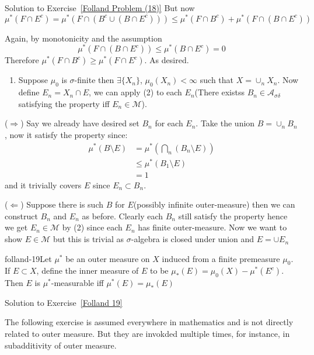 \begin{mystsolution}{Solution to Exercise~\ref{Folland Problem (18)}}
But now
\begin{equation}
\mu^*(F\cap E^c) = \mu^*(F\cap (B^c \cup (B\cap E^c))) \leq \mu^*(F\cap B^c)  + \mu^*(F\cap (B\cap E^c))
\end{equation}

Again, by monotonicity and the assumption
\begin{equation}
\mu^*(F\cap (B\cap E^c))\leq \mu^*(B\cap E^c) = 0
\end{equation}
Therefore
$\mu^*(F \cap B^c) \geq  \mu^*(F\cap E^c)$. As desired.

\begin{enumerate}[resume]
\item Suppose $\mu_0$ is $\sigma$-finite then $\exists \{X_n\}$, $\mu_0(X_n)<\infty$ such that $X = \cup_n X_n$. Now define $E_n= X_n\cap E$, we can apply (2) to each $E_n$(There existss $B_n\in \mathcal A_{\sigma\delta}$ satisfying the property iff $E_n\in \mathcal M$).
\end{enumerate}

($\Longrightarrow$)  Say we already have desired set $B_n$ for each $E_n$. Take the union $B=\cup_n B_n$, now it satisfy the property since:
\begin{equation}
\begin{aligned}
\mu^*(B\setminus E) &=\mu^*(\bigcap_n (B_n \setminus E))  \\
&\leq \mu^*(B_1\setminus E) \\
&=1
\end{aligned}
\end{equation}
and it trivially covers $E$ since $E_n \subset B_n$.

($\Longleftarrow$) Suppose there is such $B$ for $E$(possibly infinite outer-measure) then we can construct $B_n$ and $E_n$ as before. Clearly each $B_n$ still satisfy the property hence we get $E_n \in \mathcal M$ by (2) since each $E_n$ has finite outer-measure. Now we want to show $E \in \mathcal M$ but this is trivial as $\sigma$-algebra is closed under union and $E= \cup E_n$

\end{mystsolution}
\begin{mystexercise}{}{folland-19}\label{Folland 19}\label{folland 19}Let $\mu^*$ be an outer measure on $X$ induced from a finite premeasure $\mu_0$. If $E \subset X$, define the inner measure of $E$ to be $\mu_*(E) = \mu_0(X) - \mu^*(E^c)$. Then $E$ is $\mu^*$-measurable iff $\mu^*(E) = \mu_*(E)$

\end{mystexercise}
\begin{mystsolution}{Solution to Exercise~\ref{Folland 19}}\end{mystsolution}
The following exercise is assumed everywhere in mathematics and is not directly related to outer measure. But they are invokded multiple times, for instance, in subadditivity of outer measure.

